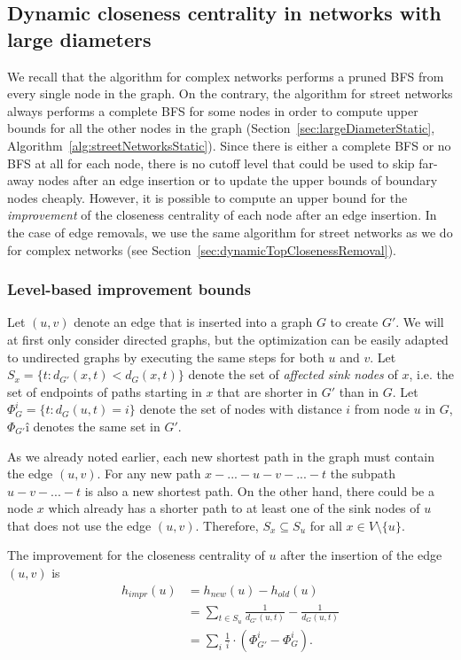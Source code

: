 \subsection{Dynamic closeness centrality in networks with large diameters}
We recall that the algorithm for complex networks performs a pruned BFS from every single node in the graph. On the contrary, the algorithm for street networks always performs a complete BFS for some nodes in order to compute upper bounds for all the other nodes in the graph (Section~\ref{sec:largeDiameterStatic}, Algorithm~\ref{alg:streetNetworksStatic}). Since there is either a complete BFS or no BFS at all for each node, there is no cutoff level that could be used to skip far-away nodes after an edge insertion or to update the upper bounds of boundary nodes cheaply. However, it is possible to compute an upper bound for the \emph{improvement} of the closeness centrality of each node after an edge insertion. In the case of edge removals, we use the same algorithm for street networks as we do for complex networks (see Section~\ref{sec:dynamicTopClosenessRemoval}).


\subsubsection{Level-based improvement bounds}
\label{sec:levelBasedImprovementBounds}
Let $(u, v)$ denote an edge that is inserted into a graph $G$ to create $G'$. We will at first only consider directed graphs, but the optimization can be easily adapted to undirected graphs by executing the same steps for both $u$ and $v$.  Let $S_{x} = \{t : d_{G'}(x, t) < d_G(x, t)\}$ denote the set of \emph{affected sink nodes} of $x$, i.e. the set of endpoints of paths starting in $x$ that are shorter in $G'$ than in $G$. Let $\Phi_{G}^i = \{t : d_G(u, t) = i\}$ denote the set of nodes with distance $i$ from node $u$ in $G$, $\Phi_{G'}î$ denotes the same set in $G'$.

As we already noted earlier, each new shortest path in the graph must contain the edge $(u, v)$. For any new path $x - ... - u - v - ... - t$ the subpath $u - v - ... - t$ is also a new shortest path. On the other hand, there could be a node $x$ which already has a shorter path to at least one of the sink nodes of $u$ that does not use the edge $(u, v)$. Therefore, $S_x \subseteq S_u$ for all $x \in V \setminus \{u\}$.

\begin{definition}
The improvement for the closeness centrality of $u$ after the insertion of the edge $(u, v)$ is 
\begin{align}
	h_{impr}(u) &= h_{new}(u) - h_{old}(u) \nonumber \\
	            &= \sum_{t \in S_u}{\frac{1}{d_{G'}(u, t)} - \frac{1}{d_G(u, t)}} \nonumber \\
	            &= \sum_{i}{\frac{1}{i} \cdot \left(\Phi_{G'}^i - \Phi_G^i\right)} \label{eq:levelImprovementBound}.
\end{align}
\end{definition}

